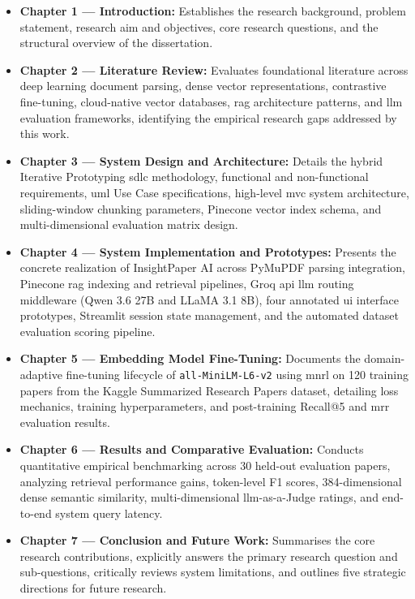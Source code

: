 \begin{itemize}
    \item \textbf{Chapter 1 — Introduction:} Establishes the research background, problem statement, research aim and objectives, core research questions, and the structural overview of the dissertation.
    \item \textbf{Chapter 2 — Literature Review:} Evaluates foundational literature across deep learning document parsing, dense vector representations, contrastive fine-tuning, cloud-native vector databases, \gls{rag} architecture patterns, and \gls{llm} evaluation frameworks, identifying the empirical research gaps addressed by this work.
    \item \textbf{Chapter 3 — System Design and Architecture:} Details the hybrid Iterative Prototyping \gls{sdlc} methodology, functional and non-functional requirements, \gls{uml} Use Case specifications, high-level \gls{mvc} system architecture, sliding-window chunking parameters, Pinecone vector index schema, and multi-dimensional evaluation matrix design.
    \item \textbf{Chapter 4 — System Implementation and Prototypes:} Presents the concrete realization of InsightPaper AI across PyMuPDF parsing integration, Pinecone \gls{rag} indexing and retrieval pipelines, Groq \gls{api} \gls{llm} routing middleware (Qwen 3.6 27B and LLaMA 3.1 8B), four annotated \gls{ui} interface prototypes, Streamlit session state management, and the automated dataset evaluation scoring pipeline.
    \item \textbf{Chapter 5 — Embedding Model Fine-Tuning:} Documents the domain-adaptive fine-tuning lifecycle of \texttt{all-MiniLM-L6-v2} using \gls{mnrl} on 120 training papers from the Kaggle Summarized Research Papers dataset, detailing loss mechanics, training hyperparameters, and post-training Recall@5 and \gls{mrr} evaluation results.
    \item \textbf{Chapter 6 — Results and Comparative Evaluation:} Conducts quantitative empirical benchmarking across 30 held-out evaluation papers, analyzing retrieval performance gains, token-level F1 scores, 384-dimensional dense semantic similarity, multi-dimensional \gls{llm}-as-a-Judge ratings, and end-to-end system query latency.
    \item \textbf{Chapter 7 — Conclusion and Future Work:} Summarises the core research contributions, explicitly answers the primary research question and sub-questions, critically reviews system limitations, and outlines five strategic directions for future research.
\end{itemize}
